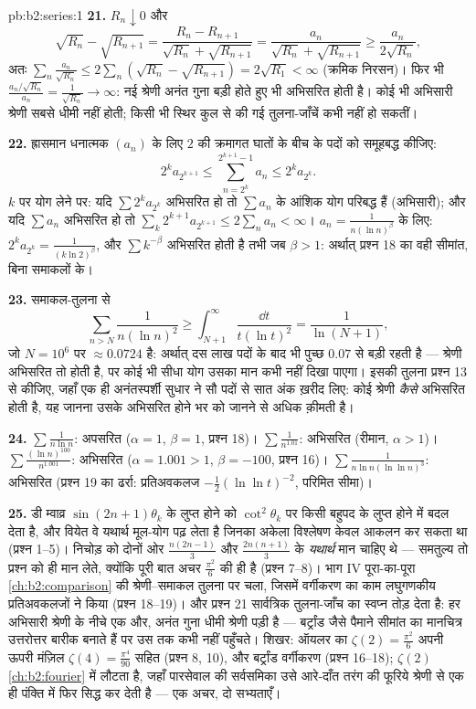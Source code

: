 \begin{solution}{pb:b2:series:1}
\textbf{21.} $R_n \downarrow 0$ और
\[
\sqrt{R_n} - \sqrt{R_{n+1}} = \frac{R_n -
R_{n+1}}{\sqrt{R_n} + \sqrt{R_{n+1}}} =
\frac{a_n}{\sqrt{R_n} + \sqrt{R_{n+1}}} \geq
\frac{a_n}{2\sqrt{R_n}},
\]
अतः $\sum_n \frac{a_n}{\sqrt{R_n}} \leq 2\sum_n(\sqrt{R_n} -
\sqrt{R_{n+1}}) = 2\sqrt{R_1} < \infty$ (क्रमिक निरसन)। फिर भी $\frac{a_n/\sqrt{R_n}}{a_n} = \frac1{\sqrt{R_n}} \to \infty$: नई श्रेणी अनंत गुना बड़ी होते हुए भी
अभिसरित होती है। कोई भी अभिसारी श्रेणी सबसे धीमी नहीं होती; किसी भी
स्थिर कुल से की गई तुलना-जाँचें कभी  नहीं हो सकतीं।

\textbf{22.} ह्रासमान धनात्मक $(a_n)$ के लिए $2$ की क्रमागत घातों के बीच के
पदों को समूहबद्ध कीजिए:
\[
2^{k}a_{2^{k+1}} \leq \sum_{n=2^k}^{2^{k+1}-1} a_n \leq
2^ka_{2^k} .
\]
$k$ पर योग लेने पर: यदि $\sum 2^ka_{2^k}$ अभिसरित हो तो $\sum a_n$ के आंशिक योग परिबद्ध हैं
(अभिसारी); और यदि $\sum a_n$ अभिसरित हो तो $\sum_k 2^{k+1}a_{2^{k+1}} \leq 2\sum_n a_n <
\infty$। $a_n = \frac1{n(\ln n)^\beta}$ के लिए: $2^ka_{2^k} =
\frac{1}{(k\ln 2)^\beta}$, और $\sum k^{-\beta}$
अभिसरित होती है तभी जब $\beta > 1$: अर्थात् प्रश्न 18 का वही सीमांत, बिना
समाकलों के।

\textbf{23.} समाकल-तुलना से
\[
\sum_{n > N}\frac{1}{n(\ln n)^2} \geq
\int_{N+1}^{\infty}\frac{\dd t}{t(\ln t)^2} =
\frac{1}{\ln(N+1)},
\]
जो $N = 10^6$ पर $\approx 0.0724$ है: अर्थात् दस लाख पदों के बाद भी पुच्छ $0.07$ से बड़ी रहती
है --- श्रेणी अभिसरित तो होती है, पर कोई भी सीधा योग उसका मान कभी नहीं
दिखा पाएगा। इसकी तुलना प्रश्न 13 से कीजिए, जहाँ एक ही अनंतस्पर्शी सुधार
ने सौ पदों से सात अंक ख़रीद लिए: कोई श्रेणी \emph{कैसे} अभिसरित होती है,
यह जानना उसके अभिसरित होने भर को जानने से अधिक क़ीमती है।

\textbf{24.} $\sum\frac1{n\ln n}$: अपसरित ($\alpha = 1$, $\beta = 1$, प्रश्न 18)। $\sum\frac1{n^{1.01}}$: अभिसरित (रीमान,
$\alpha > 1$)। $\sum\frac{(\ln n)^{100}}{n^{1.001}}$: अभिसरित ($\alpha = 1.001 > 1$, $\beta = -100$, प्रश्न 16)। $\sum\frac1{n\ln n(\ln\ln n)^3}$: अभिसरित (प्रश्न 19 का
ढर्रा: प्रतिअवकलज $-\frac12(\ln\ln t)^{-2}$, परिमित सीमा)।

\textbf{25.} डी म्वाव्र $\sin(2n{+}1)
\theta_k$ के लुप्त होने को $\cot^2\theta_k$ पर किसी बहुपद के लुप्त
होने में बदल देता है, और वियेत वे यथार्थ मूल-योग पढ़ लेता है जिनका अकेला
विश्लेषण केवल आकलन कर सकता था (प्रश्न 1--5)। निचोड़ को दोनों ओर $\frac{n(2n-1)}3$ और
$\frac{2n(n+1)}3$ के \emph{यथार्थ} मान चाहिए थे --- समतुल्य तो प्रश्न को ही मान लेते,
क्योंकि पूरी बात अचर $\frac{\pi^2}6$ की ही है (प्रश्न 7--8)। भाग IV पूरा-का-पूरा \cref{ch:b2:comparison}
की श्रेणी--समाकल तुलना पर चला, जिसमें वर्गीकरण का काम लघुगणकीय
प्रतिअवकलजों ने किया (प्रश्न 18--19)। और प्रश्न 21 सार्वत्रिक
तुलना-जाँच का स्वप्न तोड़ देता है: हर अभिसारी श्रेणी के नीचे एक और, अनंत
गुना धीमी श्रेणी पड़ी है --- बर्ट्रांड जैसे पैमाने सीमांत का मानचित्र
उत्तरोत्तर बारीक बनाते हैं पर उस तक कभी नहीं पहुँचते। शिखर: ऑयलर का $\zeta(2)
= \frac{\pi^2}6$
अपनी ऊपरी मंज़िल $\zeta(4) =
\frac{\pi^4}{90}$ सहित (प्रश्न 8, 10), और बर्ट्रांड वर्गीकरण (प्रश्न
16--18); $\zeta(2)$ \cref{ch:b2:fourier} में लौटता है, जहाँ पारसेवाल की सर्वसमिका उसे आरे-दाँत
तरंग की फूरिये श्रेणी से एक ही पंक्ति में फिर सिद्ध कर देती है --- एक
अचर, दो सभ्यताएँ।
\end{solution}
